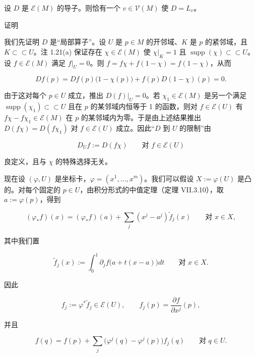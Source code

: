 \begin{theorem}

设 $ D $ 是 $ \mathcal{E}(M) $ 的导子。则恰有一个 $ v \in \mathcal{V}(M) $ 使 $ D = L_{v} $。

证明

\begin{subitems}
\item

我们先证明 $ D $ 是“局部算子”。设 $ U $ 是 $ p \in M $ 的开邻域、$ K $ 是 $ p $ 的紧邻域，且 $ K \subset\subset U $。注 1.21(a) 保证存在 $ \chi \in \mathcal{E}(M) $ 使 $ \chi|_{K} = 1 $ 且 $ \operatorname{supp}(\chi) \subset\subset U $。
设 $ f \in \mathcal{E}(M) $ 满足 $ f|_{U} = 0 $。则 $ f = f\chi + f(1 - \chi) = f(1 - \chi) $，从而

\[
Df(p) = Df(p)\bigl(1 - \chi(p)\bigr) + f(p) D(1 - \chi)(p) = 0 .
\]

由于这对每个 $ p \in U $ 成立，推出 $ D(f)|_{U} = 0 $。若 $ \chi_{1} \in \mathcal{E}(M) $ 是另一个满足 $ \operatorname{supp}(\chi_{1}) \subset\subset U $ 且在 $ p $ 的某邻域内恒等于 1 的函数，则对 $ f \in \mathcal{E}(U) $ 有 $ f\chi - f\chi_{1} \in \mathcal{E}(M) $ 在 $ p $ 的某邻域内为零。于是由上述结果推出 $ D(f\chi) = D(f\chi_{1}) $ 对 $ f \in \mathcal{E}(U) $ 成立。因此“$ D $ 到 $ U $ 的限制”由

\[
D_{U} f := D(f\chi) \qquad \text{对 } f \in \mathcal{E}(U)
\]

良定义，且与 $ \chi $ 的特殊选择无关。

\item

现在设 $ (\varphi, U) $ 是坐标卡，$ \varphi = (x^{1}, \ldots, x^{m}) $。我们可以假设 $ X := \varphi(U) $ 是凸的。对每个固定的 $ p \in U $，由积分形式的中值定理（定理 VII.3.10），取 $ a := \varphi(p) $，得到

\[
(\varphi_{*} f)(x) = (\varphi_{*} f)(a) + \sum_{j} (x^{j} - a^{j}) \widetilde{f}_{j}(x) \qquad \text{对 } x \in X ,
\]

其中我们置

\[
\widetilde{f}_{j}(x) := \int_{0}^{1} \partial_{j} f\bigl(a + t(x - a)\bigr) dt \qquad \text{对 } x \in X .
\]

因此

\[
f_{j} := \varphi^{*} \widetilde{f}_{j} \in \mathcal{E}(U) , \qquad f_{j}(p) = \frac{\partial f}{\partial x^{j}}(p) ,
\]

并且

\[
f(q) = f(p) + \sum_{j} \bigl(\varphi^{j}(q) - \varphi^{j}(p)\bigr) f_{j}(q) \qquad \text{对 } q \in U .
\]


\end{subitems}
\end{theorem}
